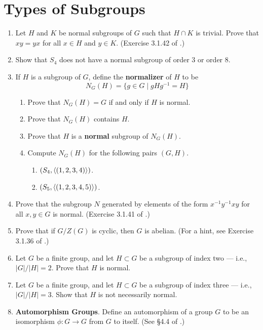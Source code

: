 \documentclass[../psets.tex]{subfiles}
\begin{document}
\section{Types of Subgroups}
\begin{enumerate}
    \item {}Let $H$ and $K$ be normal subgroups of $G$ such that $H\cap K$ is trivial. Prove that $xy=yx$ for all $x\in H$ and $y\in K$. (Exercise 3.1.42 of \textcite{bib:DummitFoote}.)
    \item Show that $S_4$ does not have a normal subgroup of order 3 or order 8.
    \item If $H$ is a subgroup of $G$, define the \textbf{normalizer} of $H$ to be
    \begin{equation*}
        N_G(H) = \{g\in G\mid gHg^{-1}=H\}
    \end{equation*}
    \begin{enumerate}
        \item Prove that $N_G(H)=G$ if and only if $H$ is normal.
        \item Prove that $N_G(H)$ contains $H$.
        \item Prove that $H$ is a \textbf{normal} subgroup of $N_G(H)$.
        \item Compute $N_G(H)$ for the following pairs $(G,H)$.
        \begin{enumerate}
            \item $(S_4,\left\langle{(1,2,3,4)}\right\rangle)$.
            \item $(S_5,\left\langle{(1,2,3,4,5)}\right\rangle)$.
        \end{enumerate}
    \end{enumerate}
    \item Prove that the subgroup $N$ generated by elements of the form $x^{-1}y^{-1}xy$ for all $x,y\in G$ is normal. (Exercise 3.1.41 of \textcite{bib:DummitFoote}.)
    \item Prove that if $G/Z(G)$ is cyclic, then $G$ is abelian. (For a hint, see Exercise 3.1.36 of \textcite{bib:DummitFoote}.)
    \item Let $G$ be a finite group, and let $H\subset G$ be a subgroup of index two --- i.e., $|G|/|H|=2$. Prove that $H$ is normal.
    \item Let $G$ be a finite group, and let $H\subset G$ be a subgroup of index three --- i.e., $|G|/|H|=3$. Show that $H$ is not necessarily normal.
    \item \textbf{Automorphism Groups}. Define an automorphism of a group $G$ to be an isomorphism $\phi:G\to G$ from $G$ to itself. (See \S 4.4 of \textcite{bib:DummitFoote}.)

\end{enumerate}
\end{document}
